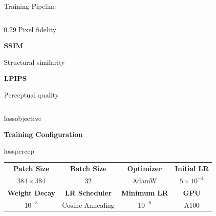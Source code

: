 \documentclass[
    11pt,%
    aspectratio=169,%
]{beamer}
\begin{document}
\begin{frame}{Training Pipeline}
\begin{columns}[T,onlytextwidth]
\begin{column}{0.29\textwidth}
Pixel fidelity

\vspace{0.10cm}

{\color{LossNavy}\bfseries\large SSIM}

Structural similarity

\vspace{0.10cm}

{\color{LossNavy}\bfseries\large LPIPS}

Perceptual quality

\end{column}

\end{columns}


\vspace{0.10cm}

\begin{beamercolorbox}[
    wd=\textwidth,
    sep=0.07cm,
    rounded=true
]{lossobjective}

    \centering
    {\color{LossNavy}\bfseries Training Configuration}

\end{beamercolorbox}

\vspace{0.03cm}

\begin{beamercolorbox}[
    wd=\textwidth,
    sep=0.04cm
]{losspercep}

\centering

\renewcommand{\arraystretch}{1.15}

\fontsize{7.5}{9}\selectfont

\begin{tabular}{cccc}
\textbf{Patch Size} &
\textbf{Batch Size} &
\textbf{Optimizer} &
\textbf{Initial LR} \\

$384\times384$ &
$32$ &
AdamW &
$5\times10^{-4}$ \\

\hline

\textbf{Weight Decay} &
\textbf{LR Scheduler} &
\textbf{Minimum LR} &
\textbf{GPU} \\

$10^{-3}$ &
Cosine Annealing &
$10^{-6}$ &
A100

\end{tabular}

\end{beamercolorbox}

\end{frame}
\end{document}
